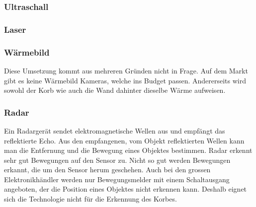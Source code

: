 \subsubsection{Ultraschall}

\subsubsection{Laser}

\subsubsection{Wärmebild}
Diese Umsetzung kommt aus mehreren Gründen nicht in Frage. Auf dem Markt gibt es keine Wärmebild Kameras, welche ins Budget passen. Andererseits wird sowohl der Korb wie auch die Wand dahinter dieselbe Wärme aufweisen.

\subsubsection{Radar}

Ein Radargerät sendet elektromagnetische Wellen aus und empfängt das reflektierte Echo. Aus den empfangenen, vom Objekt reflektierten Wellen kann man die Entfernung und die Bewegung eines Objektes bestimmen. Radar erkennt sehr gut Bewegungen auf den Sensor zu. Nicht so gut werden Bewegungen erkannt, die um den Sensor herum geschehen. Auch bei den grossen Elektronikhändler werden nur Bewegungsmelder mit einem Schaltausgang angeboten, der die Position eines Objektes nicht erkennen kann. Deshalb eignet sich die Technologie nicht für die Erkennung des Korbes.